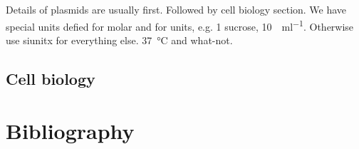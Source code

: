 Details of plasmids are usually first.
Followed by cell biology section.
We have special units defied for molar and for units, e.g. \SI{1}{\Molar} sucrose, \SI{10}{\Units\per\milli\litre}.
Otherwise use siunitx for everything else. \SI{37}{\degreeCelsius} and what-not.

\subsection*{Cell biology}

\lipsum[80]

\section*{Bibliography}

